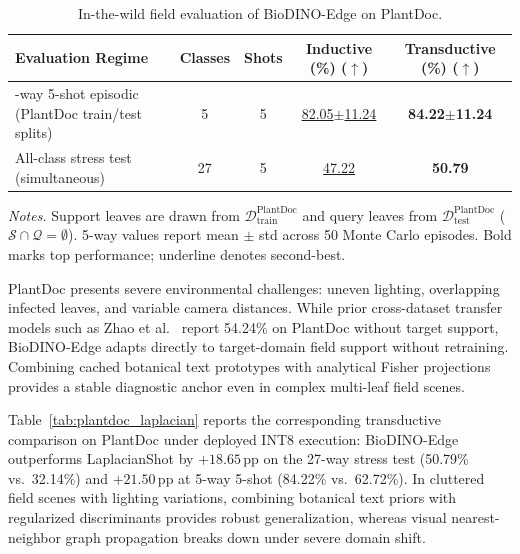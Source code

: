 \documentclass[preprint,12pt]{elsarticle}
\begin{document}
\begin{table}[htbp]
\caption{In-the-wild field evaluation of BioDINO-Edge on PlantDoc.}
\label{tab:plantdoc_context}
\centering
\footnotesize
\setlength{\tabcolsep}{4pt}
\begin{tabularx}{\columnwidth}{@{}>{\raggedright\arraybackslash}Xcccc@{}}
\toprule
\textbf{Evaluation Regime} & \textbf{Classes} & \textbf{Shots} & \textbf{Inductive (\%) ($\uparrow$)} & \textbf{Transductive (\%) ($\uparrow$)} \\
\midrule
5-way 5-shot episodic (PlantDoc train/test splits) & 5 & 5 & \underline{82.05$\pm$11.24} & \textbf{84.22$\pm$11.24} \\
All-class stress test (simultaneous) & 27 & 5 & \underline{47.22} & \textbf{50.79} \\
\bottomrule
\end{tabularx}

\vspace{3pt}
\begin{minipage}{\columnwidth}
\footnotesize
\textit{Notes.} Support leaves are drawn from $\mathcal{D}_{\text{train}}^{\text{PlantDoc}}$ and query leaves from $\mathcal{D}_{\text{test}}^{\text{PlantDoc}}$ ($\mathcal{S} \cap \mathcal{Q} = \emptyset$). 5-way values report mean $\pm$ std across 50 Monte Carlo episodes. Bold marks top performance; underline denotes second-best.
\end{minipage}
\end{table}

PlantDoc presents severe environmental challenges: uneven lighting, overlapping infected leaves, and variable camera distances. While prior cross-dataset transfer models such as Zhao et al.~\cite{zhao2026lightweight} report 54.24\% on PlantDoc without target support, BioDINO-Edge adapts directly to target-domain field support without retraining. Combining cached botanical text prototypes with analytical Fisher projections provides a stable diagnostic anchor even in complex multi-leaf field scenes.

Table~\ref{tab:plantdoc_laplacian} reports the corresponding transductive comparison on PlantDoc under deployed INT8 execution: BioDINO-Edge outperforms LaplacianShot by $+18.65$\,pp on the 27-way stress test (50.79\% vs.\ 32.14\%) and $+21.50$\,pp at 5-way 5-shot (84.22\% vs.\ 62.72\%). In cluttered field scenes with lighting variations, combining botanical text priors with regularized discriminants provides robust generalization, whereas visual nearest-neighbor graph propagation breaks down under severe domain shift.
\end{document}
